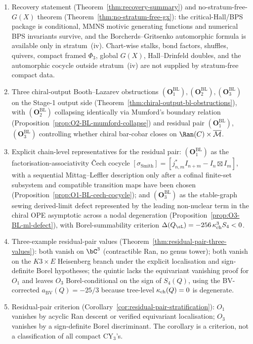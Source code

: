 \begin{enumerate}[leftmargin=2em]
\item Recovery statement (Theorem~\ref{thm:recovery-summary}) and
 no-stratum-free-$G(X)$ theorem (Theorem~\ref{thm:no-stratum-free-gx}):
 the critical-Hall/BPS package is conditional, MMNS motivic generating
 functions and numerical BPS invariants survive, and the
 Borcherds--Gritsenko automorphic formula is available only in
 stratum~(iv). Chart-wise stalks, bond factors, shuffles, quivers,
 compact framed $\Phi_3$, global $G(X)$, Hall--Drinfeld doubles, and
 the automorphic cocycle outside stratum~(iv) are not supplied by
 stratum-free compact data.
\item Three chiral-output Booth--Lazarev obstructions
 $(\mathbf{O}_1^{\mathrm{BL}}), (\mathbf{O}_2^{\mathrm{BL}}),
 (\mathbf{O}_3^{\mathrm{BL}})$ on the Stage-1 output side
 (Theorem~\ref{thm:chiral-output-bl-obstructions}), with
 $(\mathbf{O}_2^{\mathrm{BL}})$ collapsing identically via Mumford's
 boundary relation (Proposition~\ref{prop:O2-BL-mumford-collapse})
 and residual pair $(\mathbf{O}_1^{\mathrm{BL}})$,
 $(\mathbf{O}_3^{\mathrm{BL}})$ controlling whether chiral
 bar-cobar closes on $\Ran(C) \times \Mbar$.
\item Explicit chain-level representatives for the residual pair:
 $(\mathbf{O}_1^{\mathrm{BL}})$ as the
 factorisation-associativity \v{C}ech cocycle
 $[\sigma_{\mathrm{Smith}}] = [j^*_{n,m} I_{n+m} - I_n \boxtimes I_m]$,
 with a sequential Mittag--Leffler description only after a cofinal
 finite-set subsystem and compatible transition maps have been chosen
 (Proposition~\ref{prop:O1-BL-cech-cocycle}); and
 $(\mathbf{O}_3^{\mathrm{BL}})$ as the stable-graph sewing
 derived-limit defect represented by the leading non-nuclear term in
 the chiral OPE asymptotic across a nodal degeneration
 (Proposition~\ref{prop:O3-BL-ml-defect}), with
 Borel-summability criterion $\Delta(Q_\cL) = -256\,\kch^3 S_4 < 0$.
\item Three-example residual-pair values
 (Theorem~\ref{thm:residual-pair-three-values}): both vanish on
 $\bC^3$ (contractible Ran, no genus tower); both vanish on the
 $K3 \times E$ Heisenberg branch under the explicit localisation and
 sign-definite Borel hypotheses; the quintic lacks the equivariant
 vanishing proof for $O_1$ and leaves $O_3$ Borel-conditional on the
 sign of $S_4(Q)$, using the BV-corrected $a_{\mathrm{BV}}(Q) = -25/3$ because
 tree-level $\kappa_{\mathrm{ch}}(Q)=0$ is degenerate.
\item Residual-pair criterion
 (Corollary~\ref{cor:residual-pair-stratification}): $O_1$ vanishes by
 acyclic Ran descent or verified equivariant localisation; $O_3$
 vanishes by a sign-definite Borel discriminant. The corollary is a
 criterion, not a classification of all compact CY$_3$'s.
\end{enumerate}


